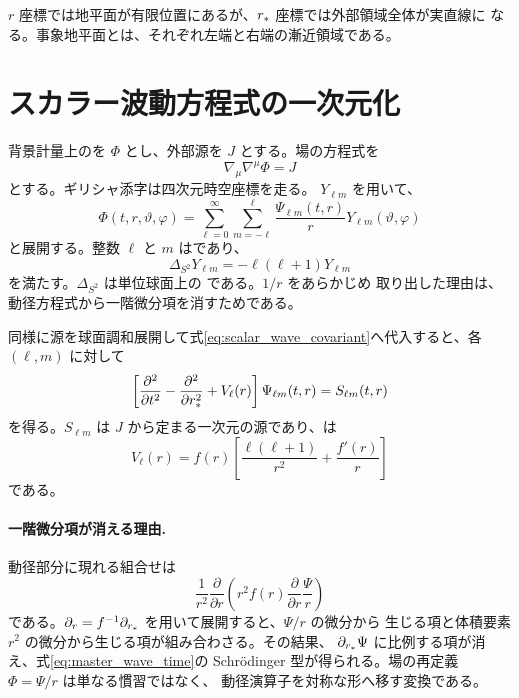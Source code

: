 $r$ 座標では地平面が有限位置にあるが、$r_*$ 座標では外部領域全体が実直線に
なる。事象地平面とは、それぞれ左端と右端の漸近領域である。

\section{スカラー波動方程式の一次元化}

背景計量上のを $\Phi$ とし、外部源を $J$ とする。場の方程式を
\begin{equation}
\nabla_\mu\nabla^\mu\Phi
=
J
\label{eq:scalar_wave_covariant}
\end{equation}
とする。ギリシャ添字は四次元時空座標を走る。 $Y_{\ell m}$ を用いて、
\begin{equation}
\Phi(t,r,\vartheta,\varphi)
=
\sum_{\ell=0}^{\infty}
\sum_{m=-\ell}^{\ell}
\frac{\Psi_{\ell m}(t,r)}{r}
Y_{\ell m}(\vartheta,\varphi)
\label{eq:scalar_decomposition}
\end{equation}
と展開する。整数 $\ell$ と $m$ はであり、
\begin{equation}
\Delta_{S^2}Y_{\ell m}
=
-\ell(\ell+1)Y_{\ell m}
\end{equation}
を満たす。$\Delta_{S^2}$ は単位球面上の である。$1/r$ をあらかじめ
取り出した理由は、動径方程式から一階微分項を消すためである。

同様に源を球面調和展開して式\eqref{eq:scalar_wave_covariant}へ代入すると、各
$(\ell,m)$ に対して
\begin{equation}
\left[
\frac{\partial^2}{\partial t^2}
-\frac{\partial^2}{\partial r_*^2}
+V_\ell(r)
\right]
\Psi_{\ell m}(t,r)
=
S_{\ell m}(t,r)
\label{eq:master_wave_time}
\end{equation}
を得る。$S_{\ell m}$ は $J$ から定まる一次元の源であり、は
\begin{equation}
V_\ell(r)
=
f(r)
\left[
\frac{\ell(\ell+1)}{r^2}
+\frac{f'(r)}{r}
\right]
\label{eq:scalar_effective_potential}
\end{equation}
である。

\paragraph{一階微分項が消える理由.}
動径部分に現れる組合せは
\begin{equation}
\frac{1}{r^2}
\frac{\partial}{\partial r}
\left(
r^2f(r)
\frac{\partial}{\partial r}
\frac{\Psi}{r}
\right)
\end{equation}
である。$\partial_r=f^{-1}\partial_{r_*}$ を用いて展開すると、$\Psi/r$ の微分から
生じる項と体積要素 $r^2$ の微分から生じる項が組み合わさる。その結果、
$\partial_{r_*}\Psi$ に比例する項が消え、式\eqref{eq:master_wave_time}の
Schr\"odinger 型が得られる。場の再定義 $\Phi=\Psi/r$ は単なる慣習ではなく、
動径演算子を対称な形へ移す変換である。

